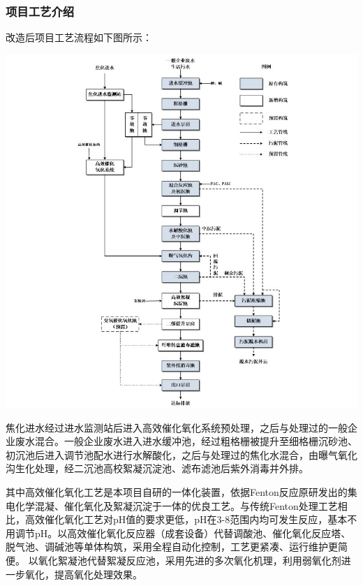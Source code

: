 \subsubsection{项目工艺介绍}
改造后项目工艺流程如下图所示：\par
{
    \centering 
    \includegraphics[width=150mm]{Img/fig3.jpg}
    \label{fig3}
}\par
焦化进水经过进水监测站后进入高效催化氧化系统预处理，之后与处理过的一般企业废水混合。一般企业废水进入进水缓冲池，经过粗格栅被提升至细格栅沉砂池、初沉池后进入调节池配水进行水解酸化，之后与处理过的焦化水混合，由曝气氧化沟生化处理，经二沉池高校絮凝沉淀池、滤布滤池后紫外消毒并外排。\par
其中高效催化氧化工艺是本项目自研的一体化装置，依据Fenton反应原研发出的集电化学混凝、催化氧化及絮凝沉淀于一体的优良工艺。与传统Fenton处理工艺相比，高效催化氧化工艺对pH值的要求更低，pH在3-8范围内均可发生反应，基本不用调节pH。以高效催化氧化反应器（成套设备）代替调酸池、催化氧化反应塔、脱气池、调碱池等单体构筑，采用全程自动化控制，工艺更紧凑、运行维护更简便。
以氧化絮凝池代替絮凝反应池，采用先进的多次氧化机理，利用弱氧化剂进一步氧化，提高氧化处理效果。\par

